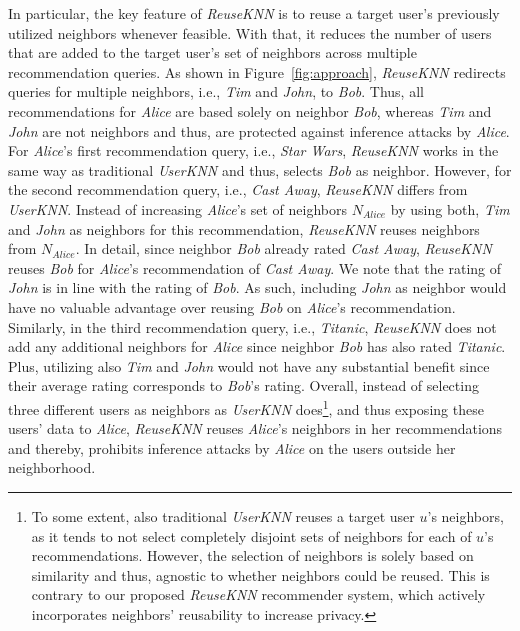 \documentclass[manuscript,review,anonymous]{acmart}
\begin{document}
In particular, the key feature of \emph{ReuseKNN} is to reuse a target user's previously utilized neighbors whenever feasible.
With that, it reduces the number of users that are added to the target user's set of neighbors across multiple recommendation queries.
As shown in Figure~\ref{fig:approach}, \emph{ReuseKNN} redirects queries for multiple neighbors, i.e., \emph{Tim} and \emph{John}, to \emph{Bob}.
Thus, all recommendations for \emph{Alice} are based solely on neighbor \emph{Bob}, whereas \emph{Tim} and \emph{John} are not neighbors and thus, are protected against inference attacks by \emph{Alice}.
For \emph{Alice}'s first recommendation query, i.e., \emph{Star Wars}, \emph{ReuseKNN} works in the same way as traditional \emph{UserKNN} and thus, selects \emph{Bob} as neighbor.
However, for the second recommendation query, i.e., \emph{Cast Away}, \emph{ReuseKNN} differs from \emph{UserKNN}.
Instead of increasing \emph{Alice}'s set of neighbors $N_{Alice}$ by using both, \emph{Tim} and \emph{John} as neighbors for this recommendation, \emph{ReuseKNN} reuses neighbors from $N_{Alice}$.
In detail, since neighbor \emph{Bob} already rated \emph{Cast Away}, \emph{ReuseKNN} reuses \emph{Bob} for \emph{Alice}'s recommendation of \emph{Cast Away}.
We note that the rating of \emph{John} is in line with the rating of \emph{Bob}.
As such, including \emph{John} as neighbor would have no valuable advantage over reusing \emph{Bob} on \emph{Alice}'s recommendation.
Similarly, in the third recommendation query, i.e., \emph{Titanic}, \emph{ReuseKNN} does not add any additional neighbors for \emph{Alice} since neighbor \emph{Bob} has also rated \emph{Titanic}.
Plus, utilizing also \emph{Tim} and \emph{John} would not have any substantial benefit since their average rating corresponds to \emph{Bob}'s rating.
Overall, instead of selecting three different users as neighbors as \emph{UserKNN} does\footnote{To some extent, also traditional \emph{UserKNN} reuses a target user $u$'s neighbors, as it tends to not select completely disjoint sets of neighbors for each of $u$'s recommendations.
However, the selection of neighbors is solely based on similarity and thus, agnostic to whether neighbors could be reused. This is contrary to our proposed \emph{ReuseKNN} recommender system, which actively incorporates neighbors' reusability to increase privacy.}, and thus exposing these users' data to \emph{Alice}, \emph{ReuseKNN} reuses \emph{Alice}'s neighbors in her recommendations and thereby, prohibits inference attacks by \emph{Alice} on the users outside her neighborhood.
\end{document}
